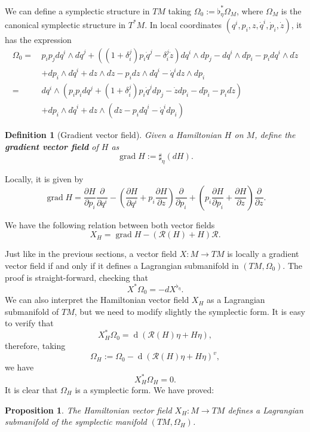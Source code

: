 \documentclass[12pt]{article}
\newtheorem{prop}{Proposition}[section]
\newtheorem{Def}{Definition}[section]
\newcommand{\grad}{\operatorname{grad}}
\renewcommand{\d}{\operatorname{d}}
\newcommand{\partder}[2]{\frac{\partial #1}{\partial #2}}
\begin{document}
We can define a symplectic structure in $TM$ taking $\Omega_0 := \flat_\eta^* \Omega_M$, where $\Omega_M$ is the canonical symplectic structure in $T^*M$. In local coordinates $(q^i, p_i, z, \dot{q}^i, \dot{p}_i, \dot{z})$, it has the expression
\begin{align*}
    \Omega_0 =\,& p_ip_j dq^i \wedge d\dot{q}^j + \left((1 + \delta_i ^j)p_i \dot{q}^j  - \delta_i^j\dot{z}\right) dq^i \wedge dp_j - dq^i \wedge d\dot{p}_i - p_i dq^i \wedge d\dot{z}\\
     &+ dp_i \wedge d\dot{q}^i + dz \wedge d\dot{z} - p_i dz \wedge d\dot{q}^i - \dot{q}^i dz \wedge dp_i \\
     = \,& dq^i \wedge \left (p_ip_i dq^j + (1 + \delta_i^j)p_i \dot{q}^j dp_j - \dot{z} dp_i - d\dot{p}_i - p_i d\dot{z}\right) \\
     & + dp_i \wedge d\dot{q}^i  + dz \wedge \left( d\dot{z} - p_id\dot{q}^i - \dot{q}^i dp_i\right)
\end{align*}
 \begin{Def}[Gradient vector field] Given a Hamiltonian $H$ on $M$, define the \textbf{gradient vector field} of $H$ as $$\grad H := \sharp_\eta(dH).$$
 \end{Def}
 Locally, it is given by $$\grad H = \partder{H}{p_i} \partder{}{q^i} - \left (\partder{H}{q^i} + p_i\partder{H}{z} \right) \partder{}{p_i} + \left( p_i \partder{H}{p_i} + \partder{H}{z}\right ) \partder{}{z}.$$

 We have the following relation between both vector fields $$X_H = \grad H - (\mathcal{R}(H) + H ) \mathcal{R}.$$
 
 Just like in the previous sections, a vector field $X: M \rightarrow TM$ is locally a gradient vector field if and only if it defines a Lagrangian submanifold in $(TM , \Omega_0)$. The proof is straight-forward, checking that $$X^*\Omega_0 = - dX^{\flat_\eta}.$$
We can also interpret the Hamiltonian vector field $X_H$ as a Lagrangian submanifold of $TM$, but we need to modify slightly the symplectic form. It is easy to verify that $$X_H^*\Omega_0 = \d(\mathcal{R}(H) \eta + H\eta),$$ therefore, taking $$ \Omega_H:= \Omega_0 - \d(\mathcal{R}(H) \eta + H\eta)^v,$$ we have $$X_H^*\Omega_H = 0.$$ It is clear that $\Omega_H$ is a symplectic form. We have proved:\\

\begin{prop} The Hamiltonian vector field $X_H: M \rightarrow TM$ defines a Lagrangian submanifold of the symplectic manifold $(TM,  \Omega_H)$.
\end{prop}
\end{document}
